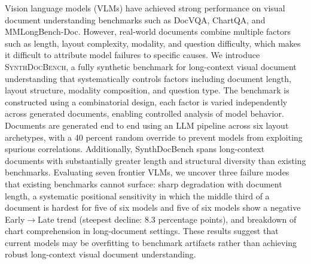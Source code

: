 
Vision language models (VLMs) have achieved strong performance on visual document understanding benchmarks such as DocVQA, ChartQA, and MMLongBench-Doc. However, real-world documents combine multiple factors such as length, layout complexity, modality, and question difficulty, which makes it difficult to attribute model failures to specific causes.
We introduce \textsc{SynthDocBench}, a fully synthetic benchmark for long-context visual document understanding that systematically controls factors including document length, layout structure, modality composition, and question type. The benchmark is constructed using a combinatorial design, each factor is varied independently across generated documents, enabling controlled analysis of model behavior. Documents are generated end to end using an LLM pipeline across six layout archetypes, with a 40 percent random override to prevent models from exploiting spurious correlations. Additionally, SynthDocBench spans long-context documents with substantially greater length and structural diversity than existing benchmarks.
Evaluating seven frontier VLMs, we uncover three failure modes that existing benchmarks cannot surface: sharp degradation with document length, a systematic positional sensitivity in which the middle third of a document is hardest for five of six models and five of six models show a negative Early$\to$Late trend (steepest decline: 8.3 percentage points), and breakdown of chart comprehension in long-document settings. These results suggest that current models may be overfitting to benchmark artifacts rather than achieving robust long-context visual document understanding.